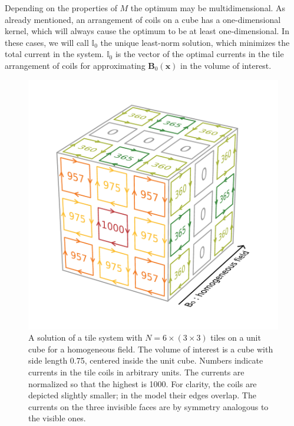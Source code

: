 Depending on the properties of $M$ the optimum may be multidimensional.
As already mentioned, an arrangement of coils on a cube has a one-dimensional kernel, which will always cause the optimum to be at least one-dimensional.
In these cases, we will call $\mathbb{I}_0$ the unique least-norm solution, which minimizes the total current in the system.
$\mathbb{I}_0$ is the vector of the optimal currents in the tile arrangement of coils for approximating $\mathbf{B}_0(\mathbf{x})$ in the volume of interest.

\begin{figure}
  \centering
  \includegraphics[width=\linewidth]{gfx/coils/homogeneous_tiles_norm_1000.pdf}
  \caption{A solution of a tile system with $N = 6 \times (3 \times 3)$ tiles on a unit cube for a homogeneous field. The volume of interest is a cube with side length \num{0.75}, centered inside the unit cube. Numbers indicate currents in the tile coils in arbitrary units. The currents are normalized so that the highest is \num{1000}. For clarity, the coils are depicted slightly smaller; in the model their edges overlap. The currents on the three invisible faces are by symmetry analogous to the visible ones.}\label{fig:homogeneous_tiles}
\end{figure}

